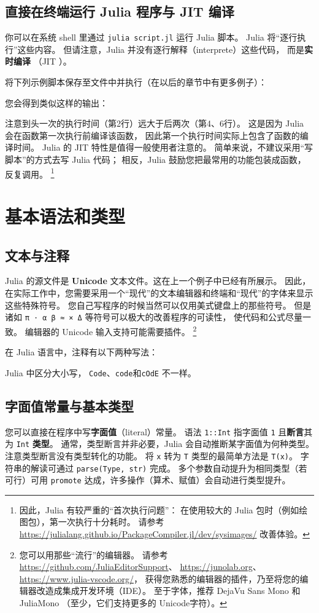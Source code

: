 \documentclass[10pt,a4paper]{article}
\begin{document}
\subsection{直接在终端运行 Julia 程序与 JIT 编译}

你可以在系统 shell 里通过 \lstinline|julia script.jl| 运行 Julia 脚本。
Julia 将“逐行执行”这些内容。
但请注意，Julia 并没有逐行解释（interprete）这些代码，
而是\textbf{实时编译} （JIT ）。

将下列示例脚本保存至文件中并执行（在以后的章节中有更多例子）：

您会得到类似这样的输出：

注意到头一次的执行时间（第2行）远大于后两次（第4、6行）。
这是因为 Julia 会在函数第一次执行前编译该函数，
因此第一个执行时间实际上包含了函数的编译时间。
Julia 的 JIT 特性是值得一般使用者注意的。
简单来说，不建议采用“写脚本”的方式去写 Julia 代码；
相反，Julia 鼓励您把最常用的功能包装成函数，反复调用。
\footnote{
	因此，Julia 有较严重的“首次执行问题”：
	在使用较大的 Julia 包时（例如绘图包），第一次执行十分耗时。
	请参考 \url{https://julialang.github.io/PackageCompiler.jl/dev/sysimages/} 改善体验。
}



\section{基本语法和类型}

\subsection{文本与注释}
Julia 的源文件是 \textbf{Unicode} 文本文件。这在上一个例子中已经有所展示。
因此，在实际工作中，您需要采用一个“现代”的文本编辑器和终端和“现代”的字体来显示这些特殊符号。
您自己写程序的时候当然可以仅用美式键盘上的那些符号。
但是诸如 \lstinline|π ⋅ α β ≈ × Δ| 等符号可以极大的改善程序的可读性，
使代码和公式尽量一致。
编辑器的 Unicode 输入支持可能需要插件。
\footnote{
	您可以用那些“流行”的编辑器。
	请参考\url{https://github.com/JuliaEditorSupport}、
	\url{https://junolab.org}、
	\url{https://www.julia-vscode.org/}，
	获得您熟悉的编辑器的插件，乃至将您的编辑器改造成集成开发环境（IDE）。
	至于字体，推荐 DejaVu Sans Mono 和 JuliaMono
	（至少，它们支持更多的 Unicode字符）。
} 


在 Julia 语言中，注释有以下两种写法：


Julia 中区分大小写，
\lstinline|Code|、\lstinline|code|和\lstinline|cOdE| 不一样。

\subsection{字面值常量与基本类型}
您可以直接在程序中写\textbf{字面值}（literal）常量。
语法 \lstinline|1::Int| 指字面值 \lstinline|1| 且\textbf{断言}其为 \lstinline|Int| \textbf{类型}。
通常，类型断言并非必要，Julia 会自动推断某字面值为何种类型。
注意类型断言没有类型转化的功能。
将 \lstinline|x| 转为 \lstinline|T| 类型的最简单方法是 \lstinline|T(x)|。
字符串的解读可通过 \lstinline|parse(Type, str)| 完成。
多个参数自动提升为相同类型（若可行）可用 \lstinline|promote| 达成，许多操作（算术、赋值）会自动进行类型提升。

\end{document}
